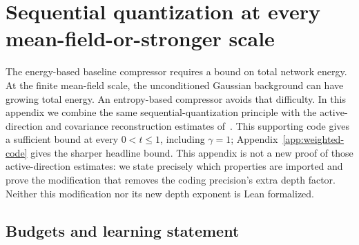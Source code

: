 \section{Sequential quantization at every mean-field-or-stronger scale}
\label{app:all-scales-quantization}

The energy-based baseline compressor requires a bound
on total network energy. At the finite mean-field scale, the unconditioned
Gaussian background can have growing total energy. An entropy-based
compressor avoids that difficulty. In this appendix we combine the same
sequential-quantization principle with the active-direction and covariance
reconstruction estimates of~\cite{all-scales}. This supporting code gives a sufficient bound at every $0<t\le1$,
including $\gamma=1$; Appendix~\ref{app:weighted-code} gives the
sharper headline bound.
This appendix is not a new proof of those active-direction estimates: we
state precisely which properties are imported and prove the modification
that removes the coding precision's extra depth factor. Neither this
modification nor its new depth exponent is Lean formalized.

\subsection{Budgets and learning statement}

